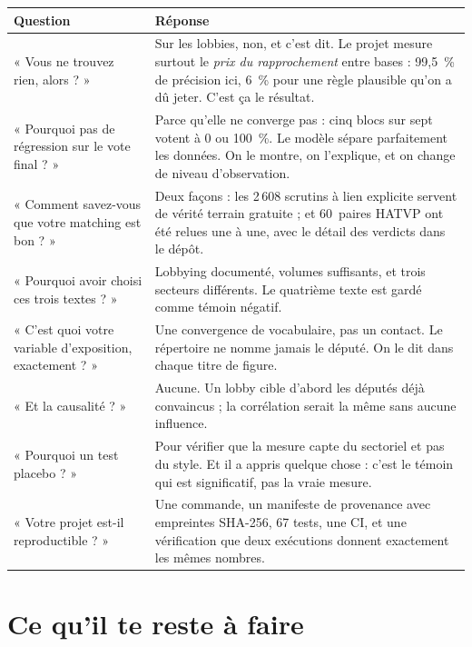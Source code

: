 \documentclass[11pt,a4paper]{article}
\begin{document}
\begin{center}
\small
\begin{longtable}{@{}p{}p{}@{}}
\toprule
\textbf{Question} & \textbf{Réponse} \\
\midrule
\endhead
« Vous ne trouvez rien, alors ? » & Sur les lobbies, non, et c'est dit. Le projet mesure
surtout le \emph{prix du rapprochement} entre bases : 99,5~\% de précision ici, 6~\% pour
une règle plausible qu'on a dû jeter. C'est ça le résultat. \\
« Pourquoi pas de régression sur le vote final ? » & Parce qu'elle ne converge pas : cinq
blocs sur sept votent à 0 ou 100~\%. Le modèle sépare parfaitement les données. On le
montre, on l'explique, et on change de niveau d'observation. \\
« Comment savez-vous que votre matching est bon ? » & Deux façons : les 2\,608 scrutins à
lien explicite servent de vérité terrain gratuite ; et 60~paires HATVP ont été relues une
à une, avec le détail des verdicts dans le dépôt. \\
« Pourquoi avoir choisi ces trois textes ? » & Lobbying documenté, volumes suffisants, et
trois secteurs différents. Le quatrième texte est gardé comme témoin négatif. \\
« C'est quoi votre variable d'exposition, exactement ? » & Une convergence de vocabulaire,
pas un contact. Le répertoire ne nomme jamais le député. On le dit dans chaque titre de
figure. \\
« Et la causalité ? » & Aucune. Un lobby cible d'abord les députés déjà convaincus ; la
corrélation serait la même sans aucune influence. \\
« Pourquoi un test placebo ? » & Pour vérifier que la mesure capte du sectoriel et pas du
style. Et il a appris quelque chose : c'est le témoin qui est significatif, pas la vraie
mesure. \\
« Votre projet est-il reproductible ? » & Une commande, un manifeste de provenance avec
empreintes SHA-256, 67 tests, une CI, et une vérification que deux exécutions donnent
exactement les mêmes nombres. \\
\bottomrule
\end{longtable}
\end{center}

\section{Ce qu'il te reste à faire}
\end{document}
